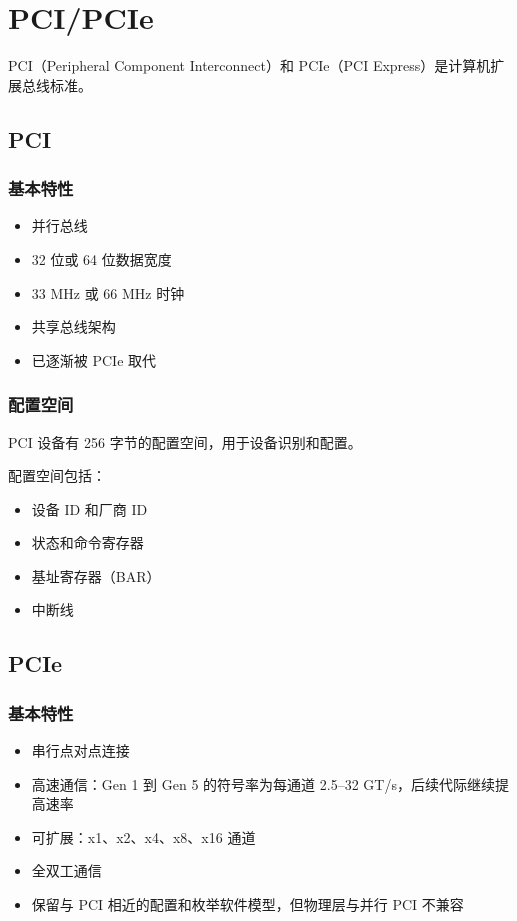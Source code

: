 \section{PCI/PCIe}

PCI（Peripheral Component Interconnect）和 PCIe（PCI Express）是计算机扩展总线标准。

\subsection{PCI}

\subsubsection{基本特性}

\begin{itemize}
  \item 并行总线
  \item 32 位或 64 位数据宽度
  \item 33 MHz 或 66 MHz 时钟
  \item 共享总线架构
  \item 已逐渐被 PCIe 取代
\end{itemize}

\subsubsection{配置空间}

PCI 设备有 256 字节的配置空间，用于设备识别和配置。


配置空间包括：
\begin{itemize}
  \item 设备 ID 和厂商 ID
  \item 状态和命令寄存器
  \item 基址寄存器（BAR）
  \item 中断线
\end{itemize}

\subsection{PCIe}

\subsubsection{基本特性}

\begin{itemize}
  \item 串行点对点连接
  \item 高速通信：Gen 1 到 Gen 5 的符号率为每通道 2.5--32 GT/s，后续代际继续提高速率
  \item 可扩展：x1、x2、x4、x8、x16 通道
  \item 全双工通信
  \item 保留与 PCI 相近的配置和枚举软件模型，但物理层与并行 PCI 不兼容
\end{itemize}

